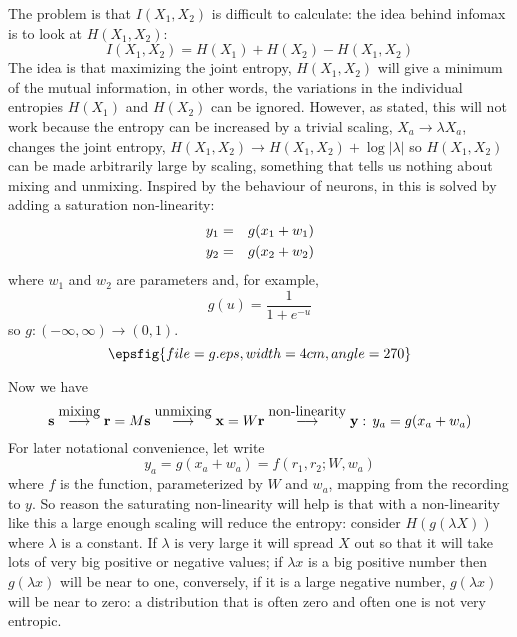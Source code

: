 \documentclass[12pt]{article}
\begin{document}
The problem is that $I(X_1,X_2)$ is difficult to calculate: the idea
behind infomax is to look at $H(X_1,X_2)$:
\begin{equation}
I(X_1,X_2)=H(X_1)+H(X_2)-H(X_1,X_2)
\end{equation}
The idea is that maximizing the joint entropy, $H(X_1,X_2)$ will give
a minimum of the mutual information, in other words, the variations in
the individual entropies $H(X_1)$ and $H(X_2)$ can be
ignored. However, as stated, this will not work because the entropy
can be increased by a trivial scaling, $X_a\rightarrow \lambda X_a$,
changes the joint entropy, $H(X_1,X_2)\rightarrow
H(X_1,X_2)+\log{|\lambda|}$ so $H(X_1,X_2)$ can be made arbitrarily
large by scaling, something that tells us nothing about mixing and
unmixing. Inspired by the behaviour of neurons, in
\cite{BellSejnowski1995} this is solved by adding a saturation
non-linearity:
\begin{eqnarray}
y_1&=&g(x_1+w_1)\cr
y_2&=&g(x_2+w_2)
\end{eqnarray}
where $w_1$ and $w_2$ are parameters and, for example,
\begin{equation}
g(u)=\frac{1}{1+e^{-u}}
\end{equation}
so $g:(-\infty,\infty)\rightarrow (0,1)$.
\begin{equation}
\epsfig{file=g.eps,width=4cm,angle=270}
\end{equation}

Now we have
\begin{equation}
{\bf s}\stackrel{\mbox{mixing}}{\longrightarrow}{\bf r}=M{\bf s}\stackrel{\mbox{unmixing}}{\longrightarrow}{\bf x}=W{\bf r}\stackrel{\mbox{non-linearity}}{\longrightarrow}{\bf y}:\,y_a=g(x_a+w_a)
\end{equation}
For later notational convenience, let write
\begin{equation}
y_a=g(x_a+w_a)=f(r_1,r_2;W,w_a)
\end{equation}
where $f$ is the function, parameterized by $W$ and $w_a$, mapping
from the recording to $y$. So reason the saturating non-linearity will
help is that with a non-linearity like this a large enough scaling
will reduce the entropy: consider $H(g(\lambda X))$ where $\lambda$ is
a constant. If $\lambda$ is very large it will spread $X$ out so that
it will take lots of very big positive or negative values; if $\lambda
x$ is a big positive number then $g(\lambda x)$ will be near to one,
conversely, if it is a large negative number, $g(\lambda x)$ will be
near to zero: a distribution that is often zero and often one is not
very entropic.
\end{document}
